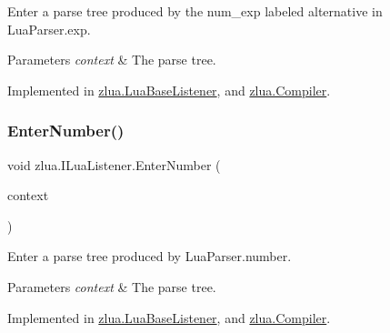 Enter a parse tree produced by the {\ttfamily num\+\_\+exp} labeled alternative in Lua\+Parser.\+exp. 


\begin{DoxyParams}{Parameters}
{\em context} & The parse tree.\\
\hline
\end{DoxyParams}


Implemented in \mbox{\hyperlink{classzlua_1_1_lua_base_listener_a76fcc42fe090e80443a7f08477fbf19f}{zlua.\+Lua\+Base\+Listener}}, and \mbox{\hyperlink{classzlua_1_1_compiler_a8ef740c20e6771534630c1c897f0f2f4}{zlua.\+Compiler}}.

\mbox{\label{interfacezlua_1_1_i_lua_listener_a2668a5683590d30b5a267950efa4e247}} 
\subsubsection{\texorpdfstring{Enter\+Number()}{EnterNumber()}}
{\footnotesize\ttfamily void zlua.\+I\+Lua\+Listener.\+Enter\+Number (\begin{DoxyParamCaption}\item[{\mbox{[}\+Not\+Null\mbox{]} \mbox{\hyperlink{classzlua_1_1_lua_parser_1_1_number_context}{Lua\+Parser.\+Number\+Context}}}]{context }\end{DoxyParamCaption})}



Enter a parse tree produced by Lua\+Parser.\+number. 


\begin{DoxyParams}{Parameters}
{\em context} & The parse tree.\\
\hline
\end{DoxyParams}


Implemented in \mbox{\hyperlink{classzlua_1_1_lua_base_listener_a7a5db34cbf48dd81e72604d07e0e0038}{zlua.\+Lua\+Base\+Listener}}, and \mbox{\hyperlink{classzlua_1_1_compiler_a1bbda8fe66a0e085fa7b659d1690cda8}{zlua.\+Compiler}}.

\mbox{\label{interfacezlua_1_1_i_lua_listener_a1633c1d8de4e31ea48b020df3c5dba75}} 

